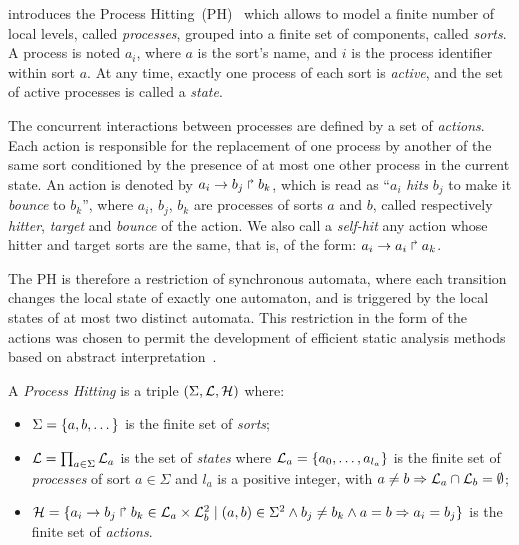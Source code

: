 

 introduces the Process Hitting~(PH)~\cite{PMR10-TCSB}
which allows to model a finite number of local levels,
called \emph{processes},
grouped into a finite set of components, called \emph{sorts}.
A process is noted $a_i$, where $a$ is the sort's name,
and $i$ is the process identifier within sort $a$.
At any time, exactly one process of each sort is \emph{active},
and the set of active processes is called a \emph{state}.

The concurrent interactions between processes are defined by a set of \emph{actions}.
Each action is responsible for the replacement of one process by another of the same sort
conditioned by the presence of at most one other process in the current state.
An action is denoted by $a_i\rightarrow b_j\Rsh b_k$, which is read as
``$a_i$ \emph{hits} $b_j$ to make it \emph{bounce} to $b_k$'',
where $a_i$, $b_j$, $b_k$ are processes of sorts $a$ and $b$,
called respectively \emph{hitter}, \emph{target} and
\emph{bounce} of the action.
We also call a \emph{self-hit} any action whose hitter and target sorts are the same,
that is, of the form: $a_i\rightarrow a_i\Rsh a_k$.

The PH is therefore a restriction of synchronous automata, where each transition
changes the local state of exactly one automaton,
and is triggered by the local states of at most two distinct automata.
This restriction in the form of the actions was chosen to permit
the development of efficient static analysis methods
based on abstract interpretation~\cite{PMR12-MSCS}.

\begin{definition}\label{def:PH}
  A \emph{Process Hitting} is a triple $(\Sigma,\mathcal{L},\mathcal{H})$ where:
  \begin{itemize}
    \item  $\Sigma = \{a,b,\dots\}$ is the finite set of \emph{sorts};
    \item  $\mathcal{L} = \prod_{a\in\Sigma} \mathcal{L}_a$ is the set of \emph{states} where
      $\mathcal{L}_a = \{a_0,\dots,a_{l_a}\}$
      is the finite set of \emph{processes} of sort $a\in\Sigma$
      and $l_a$ is a positive integer, with $a\neq b\Rightarrow \mathcal{L}_a \cap \mathcal{L}_b = \emptyset$;
    \item  $\mathcal{H} = \{ a_i\rightarrow b_j\Rsh b_k \in \mathcal{L}_a \times \mathcal{L}_b^2 \mid
      (a,b) \in \Sigma^2 \wedge b_j\neq b_k \wedge a=b\Rightarrow a_i=b_j\}$
      is the finite set of \emph{actions}.
  \end{itemize}
\end{definition}

